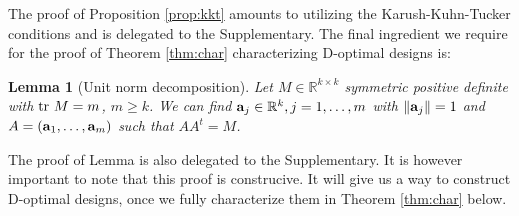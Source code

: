 \documentclass[ba]{imsart}
\newcommand{\R}{\ensuremath{\mathbb{R}}}
\newcommand{\ttr}[1]{\textup{tr}\ #1}
\theoremstyle{plain}
\newtheorem{lemma}[theorem]{Lemma}
\theoremstyle{definition}
\theoremstyle{remark}
\begin{document}
The proof of Proposition \ref{prop:kkt} amounts to utilizing the
Karush-Kuhn-Tucker conditions and is delegated to the
Supplementary. The final ingredient we require for the proof of
Theorem \ref{thm:char} characterizing D-optimal designs is:


\begin{lemma}[Unit norm decomposition]\label{lemma:free}
  Let $M \in \R^{k \times k}$ symmetric positive definite with $\ttr M
  = m$, $m \geq k$. We can find $\func_j \in \R^k,j=1,\dots,m$
  with $\|\mathbf{a}_j\|=1$ and $A = (\mathbf{a}_1,\dots,\mathbf{a}_m)$ such that
  $AA^t = M$.
\end{lemma}

The proof of Lemma is also delegated to the Supplementary. It is
however important to note that this proof is construcive. It will give
us a way to construct D-optimal designs, once we fully characterize
them in Theorem \ref{thm:char} below.
\end{document}
